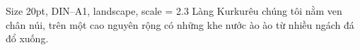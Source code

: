 \documentclass[20pt]{beamer}
\begin{document}
\begin{frame}{Size 20pt, DIN--A1, landscape, scale = 2.3}
\justifying
Làng Kurkurêu chúng tôi nằm ven chân núi, trên một cao nguyên rộng có những khe nước ào ào từ nhiều ngách đá đổ xuống.
\end{frame}
\end{document}

